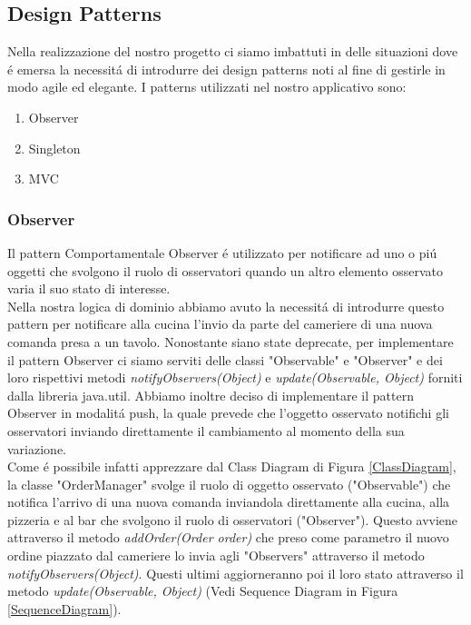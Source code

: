 \documentclass{article}
\begin{document}
\newpage

\subsection{Design Patterns}
Nella realizzazione del nostro progetto ci siamo imbattuti in delle situazioni dove \'e emersa la necessit\'a di introdurre dei design patterns noti al fine di gestirle in modo agile ed elegante. I patterns utilizzati nel nostro applicativo sono: 

\begin{enumerate}
\item Observer
\item Singleton
\item MVC
\end{enumerate}

\subsubsection{Observer}

Il pattern Comportamentale Observer \'e utilizzato per notificare ad uno o pi\'u oggetti che svolgono il ruolo di osservatori quando un altro elemento osservato varia il suo stato di interesse. \\
Nella nostra logica di dominio abbiamo avuto la necessit\'a di introdurre questo pattern per notificare alla cucina l'invio da parte del cameriere di una nuova comanda presa a un tavolo. Nonostante siano state deprecate, per implementare il pattern Observer ci siamo serviti delle classi "Observable" e "Observer" e dei loro rispettivi metodi \textit{notifyObservers(Object)} e \textit{update(Observable, Object)} forniti dalla libreria java.util. Abbiamo inoltre deciso di implementare il pattern Observer in modalit\'a push, la quale prevede che l'oggetto osservato notifichi gli osservatori inviando direttamente il cambiamento al momento della sua variazione. \\ Come \'e possibile infatti apprezzare dal Class Diagram di Figura \ref{ClassDiagram}, la classe "OrderManager" svolge il ruolo di oggetto osservato ("Observable") che notifica l'arrivo di una nuova comanda inviandola direttamente alla cucina, alla pizzeria e al bar che svolgono il ruolo di osservatori ("Observer"). Questo avviene attraverso il metodo \textit{addOrder(Order order)} che preso come parametro il nuovo ordine piazzato dal cameriere lo invia agli "Observers" attraverso il metodo \textit{notifyObservers(Object)}. Questi ultimi aggiorneranno poi il loro stato attraverso il metodo \textit{update(Observable, Object)} (Vedi Sequence Diagram in Figura \ref{SequenceDiagram}).
\end{document}
